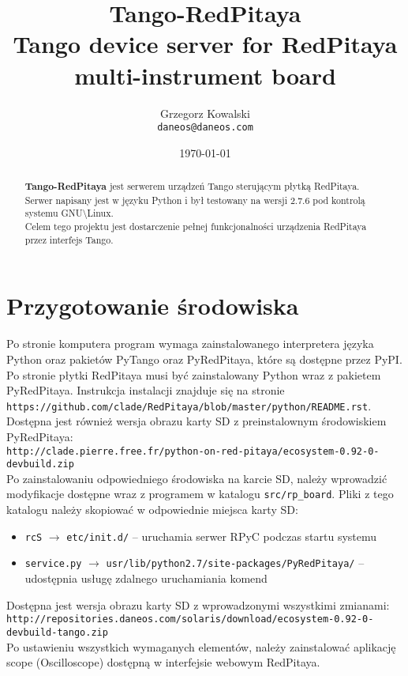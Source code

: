 \documentclass[12pt,a4paper]{article}
\title{Tango-RedPitaya\\\small{Tango device server for RedPitaya multi-instrument board}}
\author{Grzegorz Kowalski\\\texttt{daneos@daneos.com}}
\date{\today}
\begin{document}
	\maketitle
	\vspace{4em}
	
	\begin{abstract}
		\textbf{Tango-RedPitaya} jest serwerem urządzeń Tango sterującym płytką RedPitaya.\\
		Serwer napisany jest w języku Python i był testowany na wersji 2.7.6 pod kontrolą systemu GNU\textbackslash Linux.\\
		Celem tego projektu jest dostarczenie pełnej funkcjonalności urządzenia RedPitaya przez interfejs Tango.
	\end{abstract}

	\newpage
	\section{Przygotowanie środowiska}
	Po stronie komputera program wymaga zainstalowanego interpretera języka Python oraz pakietów PyTango oraz PyRedPitaya, które są dostępne przez PyPI.\\
	Po stronie płytki RedPitaya musi być zainstalowany Python wraz z pakietem PyRedPitaya. Instrukcja instalacji znajduje się na stronie\\
	\texttt{\small{https://github.com/clade/RedPitaya/blob/master/python/README.rst}}.\\
	Dostępna jest również wersja obrazu karty SD z preinstalownym środowiskiem PyRedPitaya:\\
	\texttt{\small{http://clade.pierre.free.fr/python-on-red-pitaya/ecosystem-0.92-0-devbuild.zip}}\\
	Po zainstalowaniu odpowiedniego środowiska na karcie SD, należy wprowadzić modyfikacje dostępne wraz z programem w katalogu \texttt{src/rp\_board}.
	Pliki z tego katalogu należy skopiować w odpowiednie miejsca karty SD:
	\begin{itemize}
		\item \texttt{\small{rcS}} $\to$ \texttt{\small{etc/init.d/}} -- uruchamia serwer RPyC podczas startu systemu
		\item \texttt{\small{service.py}} $\to$ \texttt{\small{usr/lib/python2.7/site-packages/PyRedPitaya/}} -- udostępnia usługę zdalnego uruchamiania komend
	\end{itemize}
	Dostępna jest wersja obrazu karty SD z wprowadzonymi wszystkimi zmianami:\\
	\texttt{\small{http://repositories.daneos.com/solaris/download/ecosystem-0.92-0-devbuild-tango.zip}}\\
	Po ustawieniu wszystkich wymaganych elementów, należy zainstalować aplikację scope (Oscilloscope) dostępną w interfejsie webowym RedPitaya.
\end{document}
